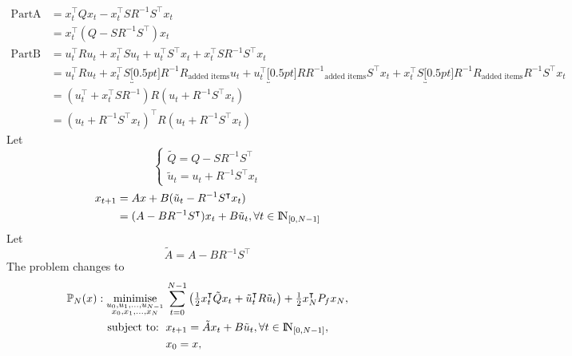 \documentclass[a4paper,11pt,reqno]{amsart}
\newcommand{\N}{{\rm I\!N}}
\newcommand{\tran}{\intercal}
\DeclareMathOperator*{\minimise}{minimise}
\begin{document}
\begin{align}
    \mathrm{PartA}&=x_t^{\tran}Qx_t-x_t^{\tran}SR^{-1}S^{\tran}x_t
    \\
    &=x_t^{\tran}(Q-SR^{-1}S^{\tran})x_t
    \\
    \mathrm{PartB}&=u_t^{\tran}Ru_t+x_t^{\tran}Su_t+u_t^{\tran}S^{\tran}x_t+x_t^{\tran}SR^{-1}S^{\tran}x_t
    \\
    &=u_t^{\tran}Ru_t+x_t^{\tran}S\!\!\!\!\!\!\underbracket[0.5pt]{R^{-1}R}_{\text{added items}}\!\!\!\!\!u_t+u_t^{\tran}\!\!\!\!\!\!\underbracket[0.5pt]{RR^{-1}}_{\text{added items}}\!\!\!\!\!S^{\tran}x_t+x_t^{\tran}S\!\!\!\!\!\!\underbracket[0.5pt]{R^{-1}R}_{\text{added items}}\!\!\!\!\!R^{-1}S^{\tran}x_t
    \\
    &=(u_t^{\tran}+x_t^{\tran}SR^{-1})R(u_t+R^{-1}S^{\tran}x_t)
    \\
    &=(u_t+R^{-1}S^{\tran}x_t)^{\tran}R(u_t+R^{-1}S^{\tran}x_t)
\end{align}
Let
\begin{equation}
    \begin{cases}
        \tilde{Q}=Q-SR^{-1}S^{\tran}\\
        \tilde{u}_t=u_t+R^{-1}S^{\tran}x_t
    \end{cases}
    \label{eq:tilde_Q_u}
\end{equation}
\begin{align}
    x_{t+1}&=Ax+B(\tilde{u}_t-R^{-1}S^{\tran}x_t)\notag\\
    &=(A-BR^{-1}S^{\tran})x_t+B\tilde{u}_t, \forall t\in\N_{[0, N-1]}
    \label{eq:tilde_x}
\end{align}
Let
\begin{equation}
    \tilde{A}=A-BR^{-1}S^{\tran}
    \label{eq:tilde_A}
\end{equation}
The problem changes to 
\begin{subequations}
    \begin{align}
        \mathbb{P}_N(x): \minimise_{\substack{u_0,u_1,\ldots,u_{N-1}\\ x_0,x_1,\ldots,x_N}} \,
         & \sum_{t=0}^{N-1}\left(\tfrac{1}{2}
         x_t^{\tran}\tilde{Q}x_t+\tilde{u}_t^{\tran}R\tilde{u}_t\right) 
         +\tfrac{1}{2}x_N^{\tran}P_fx_N,
        \\
        \text{subject to: }\,
         & x_{t+1} = \tilde{A}x_t+B\tilde{u}_t, \forall t\in\N_{[0, N-1]},
        \\
         & x_{0} = x,
    \end{align}
\end{subequations}
\end{document}
